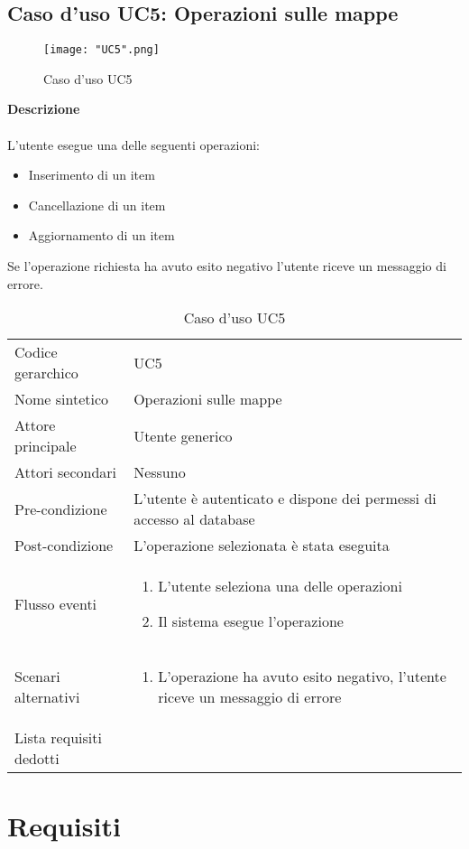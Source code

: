\documentclass[a4paper]{report}
\newcommand{\mychapter}[2]{
	\setcounter{chapter}{#1}
	\setcounter{section}{0}
	\setcounter{subsection}{1}
	\chapter*{#2}
	\addcontentsline{toc}{chapter}{#2}
}
\begin{document}
	 \section{Caso d'uso UC5: Operazioni sulle mappe}
	 \begin{figure}[H]
			\centering
			\texttt{[image: "UC5".png]}
			\caption{Caso d'uso UC5}
		\end{figure}
	 \textbf{Descrizione} \\ \\
	 L'utente esegue una delle seguenti operazioni:
	 \begin{itemize}
	 	\item Inserimento di un item
	 	\item Cancellazione di un item
	 	\item Aggiornamento di un item
	 \end{itemize}
	 Se l'operazione richiesta ha avuto esito negativo l'utente riceve un messaggio di errore.
		\begin{table}[H]
		\begin{tabularx}{\textwidth}{X | X}\toprule
			\rowcolor{orange!65}Codice gerarchico & UC5\\
			Nome sintetico & Operazioni sulle mappe\\
			\rowcolor{orange!65}Attore principale & Utente generico\\
			Attori secondari & Nessuno \\
			\rowcolor{orange!65}Pre-condizione & L'utente è autenticato e dispone dei permessi di accesso
			al database\\
			Post-condizione & L'operazione selezionata è stata eseguita\\
			\rowcolor{orange!65}Flusso eventi & \begin{enumerate}
			\item L'utente seleziona una delle operazioni
			\item Il sistema esegue l'operazione
			\end{enumerate} \\
			Scenari alternativi & \begin{enumerate}
			\item L'operazione ha avuto esito negativo, l'utente riceve un messaggio di errore
			\end{enumerate} \\
			\rowcolor{orange!65}Lista requisiti dedotti & \\
			\bottomrule
		\end{tabularx}
		\caption{Caso d'uso UC5}
	 \end{table}
	\mychapter{4}{Requisiti}
	\cleardoublepage
	\listoffigures
	
	\cleardoublepage
	\listoftables
		
\end{document}
